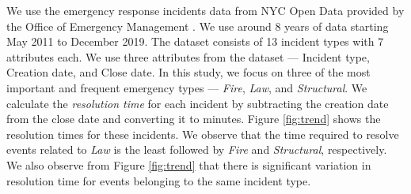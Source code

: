 

We use the emergency response incidents data from NYC Open Data provided by the Office of Emergency Management \cite{nycopendata}. We use around 8 years of data starting May 2011 to December 2019. The dataset consists of 13 incident types with 7 attributes each. We use three attributes from the dataset --- Incident type, Creation date, and Close date. In this study, we focus on three of the most important and frequent emergency types --- \textit{Fire}, \textit{Law}, and \textit{Structural}. We calculate the {\it resolution time} for each incident by subtracting the creation date from the close date and converting it to minutes. %
Figure \ref{fig:trend} shows the resolution times for these incidents. We observe that the time required to resolve events related to \textit{Law} is the least followed by %
\textit{Fire} and \textit{Structural}, respectively. We also observe from Figure \ref{fig:trend} that there is significant variation in resolution time for events belonging to the same incident type.


